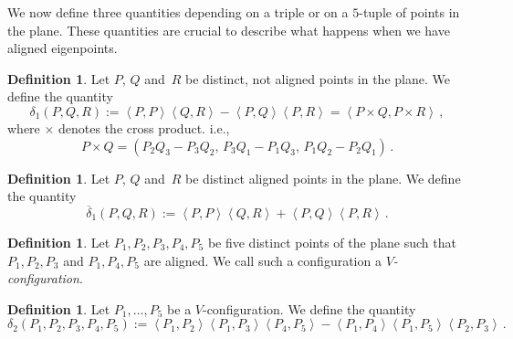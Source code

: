 \documentclass[11pt, a4paper, reqno, captions=tableheading,bibliography=totoc]{scrartcl}
\theoremstyle{plain}
\theoremstyle{definition}
\newtheorem{definition}[lemma]{Definition}
\newcommand{\scl}[2]{\left\langle {#1}, {#2} \right\rangle}
\begin{document}
We now define three quantities depending on a triple or on a $5$-tuple of points in the plane.
These quantities are crucial to describe what happens when we have aligned eigenpoints.

\begin{definition}
\label{definition:delta1}
 Let $P$, $Q$ and~$R$ be distinct, not aligned points in the plane.
 We define the quantity
 \[
  \delta_1(P, Q, R) :=
  \scl{P}{P} \scl{Q}{R} - \scl{P}{Q}\scl{P}{R}
  =
  \scl{P\times Q}{P \times R} \,,
 \]
 where $\times$ denotes the cross product. i.e.,
 \[
  P \times Q = (P_2 Q_3 - P_3 Q_2, \, P_3 Q_1 - P_1 Q_3, \, P_1 Q_2 - P_2 Q_1) \,.
 \]

\end{definition}

\begin{definition}
\label{definition:delta1b}
 Let $P$, $Q$ and~$R$ be distinct aligned points in the plane.
 We define the quantity
 \[
  \overline{\delta}_1(P, Q, R) :=
  \scl{P}{P} \scl{Q}{R} + \scl{P}{Q}\scl{P}{R} \,.
  \]
\end{definition}

\begin{definition}
\label{Vconf}
Let $P_1, P_2, P_3, P_4, P_5$ be five distinct points of the plane
such that $P_1, P_2, P_3$ and $P_1, P_4, P_5$ are aligned.
We call such a configuration a \emph{$V$-configuration}.
\end{definition}


\begin{definition}
 Let $P_1, \dots, P_5$ be a $V$-configuration.
We define the quantity
 \[
  \delta_2(P_1, P_2, P_3, P_4, P_5) :=
  \scl{P_1}{P_2} \scl{P_1}{P_3} \scl{P_4}{P_5} -
  \scl{P_1}{P_4} \scl{P_1}{P_5} \scl{P_2}{P_3} \,.
 \]
\end{definition}
\end{document}
